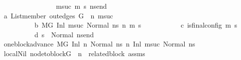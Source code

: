 \begin{isabellebody}
\ \ \ \ \ \ \isamarkupfalse%
\isanewline
\ \ \ \ \ \ \ \ \isamarkupfalse%
\ msuc{}\ m{\isacharprime}{\kern0pt}\ s{\isacharprime}{\kern0pt}\ ns{\isacharunderscore}{\kern0pt}end\isanewline
\ \ \ \ \ \ \ \ \isamarkupfalse%
\ a{\isacharcolon}{\kern0pt}\ {\isachardoublequoteopen}List{\isachardot}{\kern0pt}member\ {\isacharparenleft}{\kern0pt}out{\isacharunderscore}{\kern0pt}edges\ G\ {\isacharbang}{\kern0pt}\ n{\isacharparenright}{\kern0pt}\ msuc{}{\isachardoublequoteclose}\ \isanewline
\ \ \ \ \ \ \ \ \ \ b{\isacharcolon}{\kern0pt}\ {\isachardoublequoteopen}M{\isacharcomma}{\kern0pt}{\isasymLambda}{\isacharcomma}{\kern0pt}{\isasymGamma}{\isacharcomma}{\kern0pt}{\isasymOmega}{\isacharcomma}{\kern0pt}G\ {\isasymturnstile}{\isacharparenleft}{\kern0pt}Inl\ msuc{}{\isacharcomma}{\kern0pt}\ Normal\ ns{}{\isacharparenright}{\kern0pt}\ {\isacharminus}{\kern0pt}n{\isasymrightarrow}{\isacharasterisk}{\kern0pt}\ {\isacharparenleft}{\kern0pt}m{\isacharprime}{\kern0pt}{\isacharcomma}{\kern0pt}\ s{\isacharprime}{\kern0pt}{\isacharparenright}{\kern0pt}{\isachardoublequoteclose}\ \isanewline
\ \ \ \ \ \ \ \ \ \ c{\isacharcolon}{\kern0pt}\ {\isachardoublequoteopen}is{\isacharunderscore}{\kern0pt}final{\isacharunderscore}{\kern0pt}config\ {\isacharparenleft}{\kern0pt}m{\isacharprime}{\kern0pt}{\isacharcomma}{\kern0pt}\ s{\isacharprime}{\kern0pt}{\isacharparenright}{\kern0pt}{\isachardoublequoteclose}\ \ \isanewline
\ \ \ \ \ \ \ \ \ \ d{\isacharcolon}{\kern0pt}\ {\isachardoublequoteopen}{\isacharparenleft}{\kern0pt}s{\isacharprime}{\kern0pt}\ {\isacharequal}{\kern0pt}\ Normal\ ns{\isacharunderscore}{\kern0pt}end{\isacharparenright}{\kern0pt}{\isachardoublequoteclose}\isanewline
\ \ \ \ \ \ \ \ \isamarkupfalse%
\ one{\isacharunderscore}{\kern0pt}block{\isacharunderscore}{\kern0pt}advance{\isacharcolon}{\kern0pt}\ {\isachardoublequoteopen}M{\isacharcomma}{\kern0pt}{\isasymLambda}{\isacharcomma}{\kern0pt}{\isasymGamma}{\isacharcomma}{\kern0pt}{\isasymOmega}{\isacharcomma}{\kern0pt}G\ {\isasymturnstile}{\isacharparenleft}{\kern0pt}Inl\ n{\isacharcomma}{\kern0pt}\ Normal\ ns{}{\isacharparenright}{\kern0pt}\ {\isacharminus}{\kern0pt}n{\isasymrightarrow}\ {\isacharparenleft}{\kern0pt}Inl\ msuc{}{\isacharcomma}{\kern0pt}\ Normal\ ns{}{\isacharparenright}{\kern0pt}{\isachardoublequoteclose}\ \isanewline
\ \ \ \ \ \ \ \ \ \ \isamarkupfalse%
\ local{\isachardot}{\kern0pt}Nil\ {\isacartoucheopen}node{\isacharunderscore}{\kern0pt}to{\isacharunderscore}{\kern0pt}block{\isacharparenleft}{\kern0pt}G{\isacharparenright}{\kern0pt}\ {\isacharbang}{\kern0pt}\ n\ {\isacharequal}{\kern0pt}\ related{\isacharunderscore}{\kern0pt}block{\isacartoucheclose}\ assms{\isacharparenleft}{\kern0pt}{}{\isacharparenright}{\kern0pt}\ \isanewline

\end{isabellebody}
